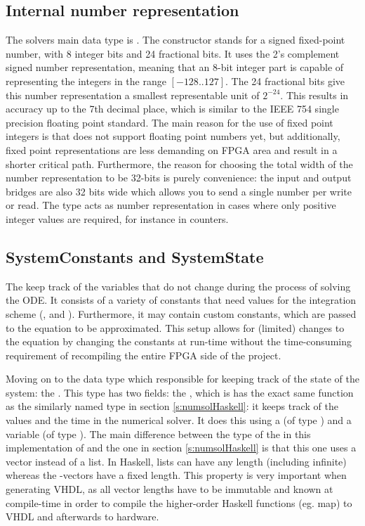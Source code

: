 \subsection{Internal number representation}
The solvers main data type is . The constructor  stands for a signed fixed-point number, with 8 integer bits and 24 fractional bits. It uses the 2's complement signed number representation, meaning that an 8-bit integer part is capable of representing the integers in the range $[-128..127]$. The 24 fractional bits give this number representation a smallest representable unit of $2^{-24}$. This results in accuracy up to the 7th decimal place, which is similar to the IEEE 754 single precision floating point standard. The main reason for the use of fixed point integers is that \clash{} does not support floating point numbers yet, but additionally, fixed point representations are less demanding on FPGA area and result in a shorter critical path. Furthermore, the reason for choosing the total width of the number representation to be 32-bits is purely convenience: the input and output bridges are also 32 bits wide which allows you to send a single number per write or read. The  type acts as number representation in cases where only positive integer values are required, for instance in counters.

\subsection{SystemConstants and SystemState}
The  keep track of the variables that do not change during the process of solving the ODE. It consists of a variety of constants that need values for the integration scheme (,  and ). Furthermore, it may contain custom constants, which are passed to the equation to be approximated. This setup allows for (limited) changes to the equation by changing the constants at run-time without the time-consuming requirement of recompiling the entire FPGA side of the project.

Moving on to the data type which responsible for keeping track of the state of the system: the . This type has two fields: the , which is has the exact same function as the similarly named type in section \ref{s:numsolHaskell}: it keeps track of the values and the time in the numerical solver. It does this using a  (of type ) and a  variable (of type ). The main difference between the type of the  in this implementation of  and the one in section \ref{s:numsolHaskell} is that this one uses a vector instead of a list. In Haskell, lists can have any length (including infinite) whereas the \clash{}-vectors have a fixed length. This property is very important when generating VHDL, as all vector lengths have to be immutable and known at compile-time in order to compile the higher-order Haskell functions (eg. map) to VHDL and afterwards to hardware. 


